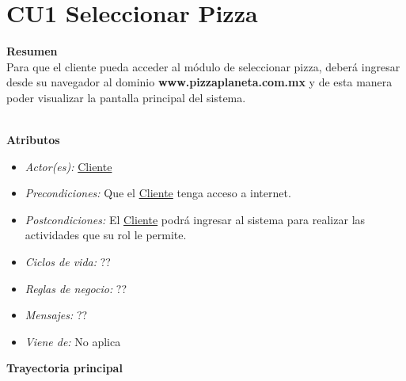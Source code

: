 
\pagebreak
\hypertarget{CU1}{}
\section{CU1 Seleccionar Pizza}

	\noindent \textbf{Resumen}\\

		Para que el cliente pueda acceder al módulo de seleccionar pizza, deberá ingresar desde su navegador al dominio {\textbf{www.pizzaplaneta.com.mx}} y de esta manera poder visualizar la pantalla principal del sistema.

	\noindent \textbf{\\Atributos}

		\begin{itemize}

			\item \textit{Actor(es):} \hyperlink{A:Cliente}{Cliente}
			\item \textit{Precondiciones:} Que el \hyperlink{A:Cliente}{Cliente} tenga acceso a internet. 
			\item \textit{Postcondiciones:} El \hyperlink{A:Cliente}{Cliente} podrá ingresar al sistema para realizar las actividades que su rol le permite.
			\item \textit{Ciclos de vida:} ??
			\item \textit{Reglas de negocio:} ??
			\item \textit{Mensajes:} ??
			\item \textit{Viene de:} No aplica

		\end{itemize} 

	\noindent \textbf{Trayectoria principal}

